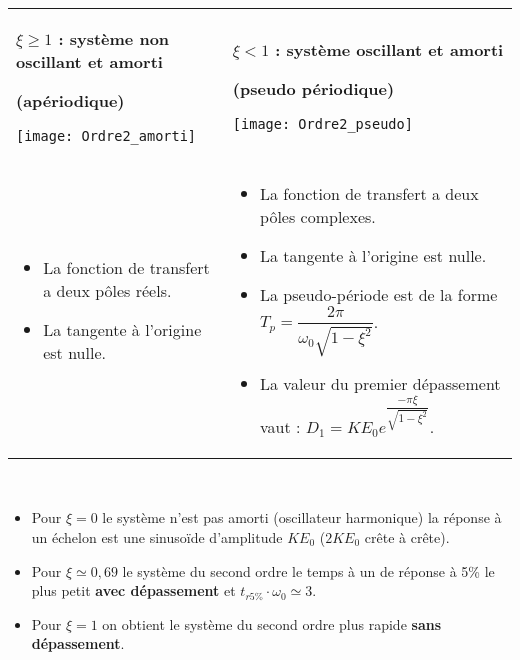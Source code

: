 \begin{resultat} ~\\

\vspace*{-1.3cm}

\noindent\begin{center}
\begin{tabular}{p{.4\linewidth}p{.58\linewidth}}
\begin{center}
\textbf{$\xi \geq 1$ : système non oscillant et amorti}

\textbf{(apériodique)}

\texttt{[image: Ordre2\_amorti]}
\end{center} 
& 
\begin{center}
\textbf{$\xi <1$ : système oscillant et amorti }

\textbf{(pseudo périodique)}

\texttt{[image: Ordre2\_pseudo]}
\end{center} 
\\
\vspace*{-1cm}
\begin{itemize} 
\item La fonction de transfert a deux pôles réels.
\item La tangente à l'origine est nulle.
\end{itemize}
& 
\vspace*{-.8cm}
\begin{itemize} 
\item La fonction de transfert a deux pôles complexes.
\item La tangente à l'origine est nulle.
\item La pseudo-période est de la forme $T_p=\dfrac{2\pi }{\omega_0 \sqrt{1-\xi^2}}$.
\item La valeur du premier dépassement vaut :  $D_1=KE_0e^{\dfrac{-\pi \xi }{\sqrt{1-\xi^2}}}$.
\end{itemize}
\end{tabular}
\end{center}
\end{resultat}

\begin{resultat} ~\\
\vspace{-.2cm}
\begin{itemize}
\item Pour $\xi=0$ le système n'est pas amorti (oscillateur harmonique) la réponse à un échelon est une sinusoïde d'amplitude $KE_0$ ($2KE_0$ crête à crête).  
\item Pour $\xi\simeq 0,69$ le système du second ordre le temps à un de réponse à 5\% le plus petit \textbf{avec dépassement} et $t_{r 5\%} \cdot \omega_0 \simeq 3$.
\item Pour $\xi =1$ on obtient le système du second ordre plus rapide \textbf{sans dépassement}.

\end{itemize}
\end{resultat}

